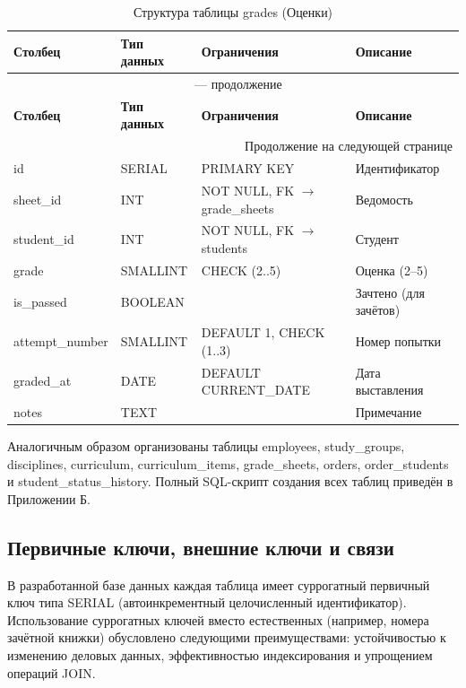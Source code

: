 \documentclass[14pt, a4paper]{extreport}
\begin{document}
\begin{longtable}{p{3cm} p{3cm} p{4cm} p{4.5cm}}
\caption{Структура таблицы grades (Оценки)} \\
\toprule
\textbf{Столбец} & \textbf{Тип данных} & \textbf{Ограничения} & \textbf{Описание} \\
\midrule
\endfirsthead
\multicolumn{4}{c}{{\tablename\ \thetable{} --- продолжение}} \\
\toprule
\textbf{Столбец} & \textbf{Тип данных} & \textbf{Ограничения} & \textbf{Описание} \\
\midrule
\endhead
\midrule
\multicolumn{4}{r}{{Продолжение на следующей странице}} \\
\endfoot
\bottomrule
\endlastfoot
id & SERIAL & PRIMARY KEY & Идентификатор \\
sheet\_id & INT & NOT NULL, FK $\rightarrow$ grade\_sheets & Ведомость \\
student\_id & INT & NOT NULL, FK $\rightarrow$ students & Студент \\
grade & SMALLINT & CHECK (2..5) & Оценка (2--5) \\
is\_passed & BOOLEAN & & Зачтено (для зачётов) \\
attempt\_number & SMALLINT & DEFAULT 1, CHECK (1..3) & Номер попытки \\
graded\_at & DATE & DEFAULT CURRENT\_DATE & Дата выставления \\
notes & TEXT & & Примечание \\
\end{longtable}

Аналогичным образом организованы таблицы employees, study\_groups, disciplines, curriculum, curriculum\_items, grade\_sheets, orders, order\_students и student\_status\_history. Полный SQL-скрипт создания всех таблиц приведён в Приложении Б.

\subsection{Первичные ключи, внешние ключи и связи}
В разработанной базе данных каждая таблица имеет суррогатный первичный ключ типа SERIAL (автоинкрементный целочисленный идентификатор). Использование суррогатных ключей вместо естественных (например, номера зачётной книжки) обусловлено следующими преимуществами: устойчивостью к изменению деловых данных, эффективностью индексирования и упрощением операций JOIN.
\end{document}
